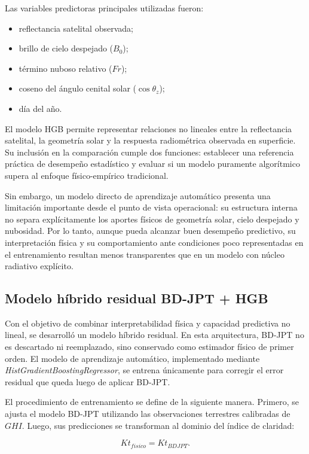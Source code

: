\documentclass[../main.tex]{subfiles}
\begin{document}
Las variables predictoras principales utilizadas fueron:

\begin{itemize}
\item reflectancia satelital observada;
\item brillo de cielo despejado ($B_0$);
\item término nuboso relativo ($Fr$);
\item coseno del ángulo cenital solar ($\cos\theta_z$);
\item día del año.
\end{itemize}

El modelo HGB permite representar relaciones no lineales entre la reflectancia satelital, la geometría solar y la respuesta radiométrica observada en superficie. Su inclusión en la comparación cumple dos funciones: establecer una referencia práctica de desempeño estadístico y evaluar si un modelo puramente algorítmico supera al enfoque físico-empírico tradicional.

Sin embargo, un modelo directo de aprendizaje automático presenta una limitación importante desde el punto de vista operacional: su estructura interna no separa explícitamente los aportes físicos de geometría solar, cielo despejado y nubosidad. Por lo tanto, aunque pueda alcanzar buen desempeño predictivo, su interpretación física y su comportamiento ante condiciones poco representadas en el entrenamiento resultan menos transparentes que en un modelo con núcleo radiativo explícito.

\subsection{Modelo híbrido residual BD-JPT + HGB}

Con el objetivo de combinar interpretabilidad física y capacidad predictiva no lineal, se desarrolló un modelo híbrido residual. En esta arquitectura, BD-JPT no es descartado ni reemplazado, sino conservado como estimador físico de primer orden. El modelo de aprendizaje automático, implementado mediante \textit{HistGradientBoostingRegressor}, se entrena únicamente para corregir el error residual que queda luego de aplicar BD-JPT.

El procedimiento de entrenamiento se define de la siguiente manera. Primero, se ajusta el modelo BD-JPT utilizando las observaciones terrestres calibradas de $GHI$. Luego, sus predicciones se transforman al dominio del índice de claridad:

\begin{equation}
Kt_{fisico} = Kt_{BDJPT}.
\end{equation}
\end{document}
